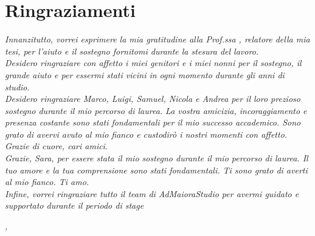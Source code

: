 \cleardoublepage
{}
{}



\bigskip

\begingroup
\let\clearpage\relax
\let\cleardoublepage\relax
\let\cleardoublepage\relax

\chapter*{Ringraziamenti}

\noindent \textit{Innanzitutto, vorrei esprimere la mia gratitudine alla Prof.ssa \myProf, relatore della mia tesi, per l'aiuto e il sostegno fornitomi durante la stesura del lavoro.}\\

\noindent \textit{Desidero ringraziare con affetto i miei genitori e i miei nonni per il sostegno, il grande aiuto e per essermi stati vicini in ogni momento durante gli anni di studio.}\\

\noindent \textit{Desidero ringraziare Marco, Luigi, Samuel, Nicola e Andrea per il loro prezioso sostegno durante il mio percorso di laurea. La vostra amicizia, incoraggiamento e presenza costante sono stati fondamentali per il mio successo accademico. Sono grato di avervi avuto al mio fianco e custodirò i nostri momenti con affetto. Grazie di cuore, cari amici.}\\

\noindent \textit{Grazie, Sara, per essere stata il mio sostegno durante il mio percorso di laurea. Il tuo amore e la tua comprensione sono stati fondamentali. Ti sono grato di averti al mio fianco. Ti amo.}\\

\noindent \textit{Infine, vorrei ringraziare tutto il team di AdMaioraStudio per avermi guidato e supportato durante il periodo di stage}\\

\bigskip

\noindent\textit{\myLocation, \myTime}
\hfill \myName

\endgroup
